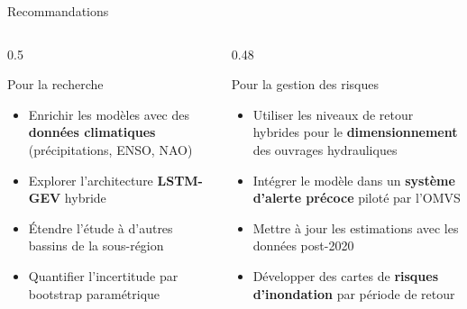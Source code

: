 \documentclass[aspectratio=169, 9pt]{beamer}
\begin{document}
\begin{frame}{Recommandations}
\begin{columns}[T]
\begin{column}{0.5\textwidth}
  \begin{block}{Pour la recherche}
    \begin{itemize}
      \item Enrichir les modèles avec des
            \textbf{données climatiques}
            (précipitations, ENSO, NAO)
      \item Explorer l'architecture
            \textbf{LSTM-GEV} hybride
      \item Étendre l'étude à d'autres
            bassins de la sous-région
      \item Quantifier l'incertitude
            par bootstrap paramétrique
    \end{itemize}
  \end{block}
\end{column}
\begin{column}{0.48\textwidth}
  \begin{block}{Pour la gestion des risques}
    \begin{itemize}
      \item Utiliser les niveaux de retour
            hybrides pour le
            \textbf{dimensionnement} des
            ouvrages hydrauliques
      \item Intégrer le modèle dans un
            \textbf{système d'alerte précoce}
            piloté par l'OMVS
      \item Mettre à jour les estimations
            avec les données post-2020
      \item Développer des cartes de
            \textbf{risques d'inondation}
            par période de retour
    \end{itemize}
  \end{block}
\end{column}
\end{columns}
\end{frame}
\end{document}
